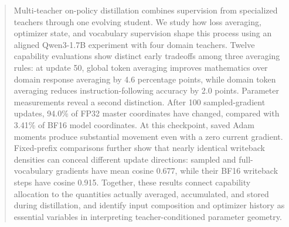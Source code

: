 \begin{abstract}
Multi-teacher on-policy distillation combines supervision from specialized teachers through one evolving student. We study how loss averaging, optimizer state, and vocabulary supervision shape this process using an aligned Qwen3-1.7B experiment with four domain teachers. Twelve capability evaluations show distinct early tradeoffs among three averaging rules: at update 50, global token averaging improves mathematics over domain response averaging by 4.6 percentage points, while domain token averaging reduces instruction-following accuracy by 2.0 points. Parameter measurements reveal a second distinction. After 100 sampled-gradient updates, 94.0\% of FP32 master coordinates have changed, compared with 3.41\% of BF16 model coordinates. At this checkpoint, saved Adam moments produce substantial movement even with a zero current gradient. Fixed-prefix comparisons further show that nearly identical writeback densities can conceal different update directions: sampled and full-vocabulary gradients have mean cosine 0.677, while their BF16 writeback steps have cosine 0.915. Together, these results connect capability allocation to the quantities actually averaged, accumulated, and stored during distillation, and identify input composition and optimizer history as essential variables in interpreting teacher-conditioned parameter geometry.
\end{abstract}
